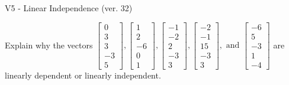 \begin{exercise}
  \begin{exerciseTitle}V5 - Linear Independence (ver. 32)\end{exerciseTitle}
  \begin{exerciseStatement}
    Explain why the vectors \(\left[\begin{array}{r}
0 \\
3 \\
3 \\
-3 \\
5
\end{array}\right] , \left[\begin{array}{r}
1 \\
2 \\
-6 \\
0 \\
1
\end{array}\right] , \left[\begin{array}{r}
-1 \\
-2 \\
2 \\
-3 \\
3
\end{array}\right] , \left[\begin{array}{r}
-2 \\
-1 \\
15 \\
-3 \\
3
\end{array}\right] , \text{ and } \left[\begin{array}{r}
-6 \\
5 \\
-3 \\
1 \\
-4
\end{array}\right]\) are linearly dependent or linearly independent.	



\end{exerciseStatement}
\end{exercise}
